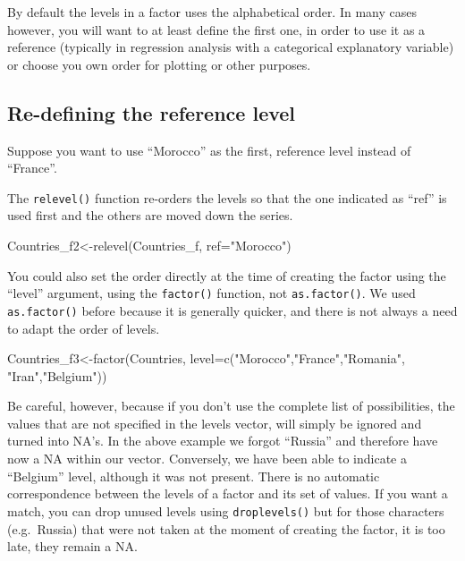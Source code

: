 \documentclass[
  letterpaper,
  DIV=11,
  numbers=noendperiod]{scrreprt}
\newenvironment{Shaded}{\begin{snugshade}}{\end{snugshade}}
\newcommand{\AttributeTok}[1]{\textcolor[rgb]{0.40,0.45,0.13}{#1}}
\newcommand{\FunctionTok}[1]{\textcolor[rgb]{0.28,0.35,0.67}{#1}}
\newcommand{\NormalTok}[1]{\textcolor[rgb]{0.00,0.23,0.31}{#1}}
\newcommand{\OtherTok}[1]{\textcolor[rgb]{0.00,0.23,0.31}{#1}}
\newcommand{\StringTok}[1]{\textcolor[rgb]{0.13,0.47,0.30}{#1}}
\begin{document}
By default the levels in a factor uses the alphabetical order. In many
cases however, you will want to at least define the first one, in order
to use it as a reference (typically in regression analysis with a
categorical explanatory variable) or choose you own order for plotting
or other purposes.

\subsection{Re-defining the reference
level}\label{re-defining-the-reference-level}

Suppose you want to use ``Morocco'' as the first, reference level
instead of ``France''.

The \texttt{relevel()} function re-orders the levels so that the one
indicated as ``ref'' is used first and the others are moved down the
series.

\begin{Shaded}
\begin{Highlighting}[]
\NormalTok{Countries\_f2}\OtherTok{\textless{}{-}}\FunctionTok{relevel}\NormalTok{(Countries\_f, }\AttributeTok{ref=}\StringTok{"Morocco"}\NormalTok{)}
\end{Highlighting}
\end{Shaded}

You could also set the order directly at the time of creating the factor
using the ``level'' argument, using the \texttt{factor()} function, not
\texttt{as.factor()}. We used \texttt{as.factor()} before because it is
generally quicker, and there is not always a need to adapt the order of
levels.

\begin{Shaded}
\begin{Highlighting}[]
\NormalTok{Countries\_f3}\OtherTok{\textless{}{-}}\FunctionTok{factor}\NormalTok{(Countries, }\AttributeTok{level=}\FunctionTok{c}\NormalTok{(}\StringTok{"Morocco"}\NormalTok{,}\StringTok{"France"}\NormalTok{,}\StringTok{"Romania"}\NormalTok{, }\StringTok{"Iran"}\NormalTok{,}\StringTok{"Belgium"}\NormalTok{))}
\end{Highlighting}
\end{Shaded}

Be careful, however, because if you don't use the complete list of
possibilities, the values that are not specified in the levels vector,
will simply be ignored and turned into NA's. In the above example we
forgot ``Russia'' and therefore have now a NA within our vector.
Conversely, we have been able to indicate a ``Belgium'' level, although
it was not present. There is no automatic correspondence between the
levels of a factor and its set of values. If you want a match, you can
drop unused levels using \texttt{droplevels()} but for those characters
(e.g.~Russia) that were not taken at the moment of creating the factor,
it is too late, they remain a NA.
\end{document}
